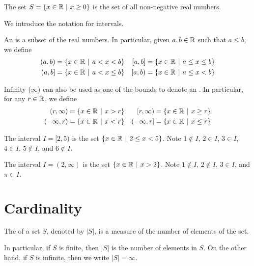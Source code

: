 \begin{example}
    The set $S = \{x \in \mathbb{R} \ | \ x \geq 0 \}$ is the set of all non-negative real numbers.
\end{example}

We introduce the notation for intervals.
\begin{definition}
    An  is a subset of the real numbers. In particular, given $a, b \in \mathbb{R}$ such that $a \leq b$, we define
    \begin{align*}
        (a,b) &= \{x \in \R \vert a < x < b\} & [a,b] &= \{x \in \R \vert a \leq x \leq b\}\\
        (a,b] &= \{x \in \R \vert a < x \leq b\} & [a,b) &= \{x \in \R \vert a \leq x < b\}
    \end{align*}

    Infinity ($\infty$) can also be used as one of the bounds to denote an . In particular, for any $r \in \mathbb{R}$, we define
    \begin{align*}
        (r, \infty) &= \{x \in \R \vert x > r\} & [r, \infty) &= \{x \in \R \vert x \geq r\}\\
        (-\infty,r) &= \{x \in \R \vert x < r\} & (-\infty,r] &= \{x \in \R \vert x \leq r\}
    \end{align*}
\end{definition}

\begin{example}
    The interval $I = [2, 5)$ is the set $\{x \in \R \vert 2 \leq x < 5\}$. Note $1 \notin I$, $2 \in I$, $3 \in I$, $4 \in I$, $5 \notin I$, and $6 \notin I$.
\end{example}

\begin{example}
    The interval $I = (2, \infty)$ is the set $\{x \in \R \vert x > 2\}$. Note $1 \notin I$, $2 \notin I$, $3 \in I$, and $\pi \in I$.
\end{example}

\section{Cardinality}
\begin{definition}
    The  of a set $S$, denoted by $|S|$, is a measure of the number of elements of the set.

    In particular, if $S$ is finite, then $|S|$ is the number of elements in $S$. On the other hand, if $S$ is infinite, then we write $|S| = \infty$.
\end{definition}

